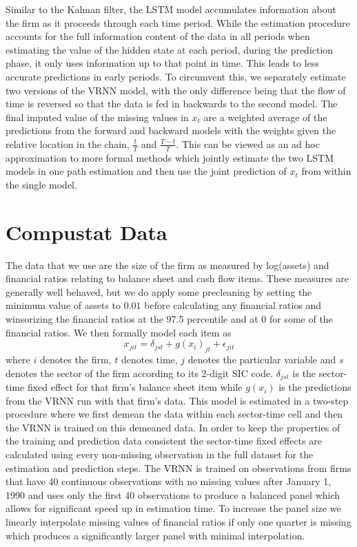 \documentclass[12pt]{article}
\begin{document}
Similar to the Kalman filter, the LSTM model accumulates information about the firm as it proceeds through each time period. 
While the estimation procedure accounts for the full information content of the data in all periods when estimating the 
value of the hidden state at each period, during the prediction phase, it only uses information up to that point in time. 
This leads to less accurate predictions in early periods. To circumvent this, we separately estimate two versions of the 
VRNN model, with the only difference being that the flow of time is reversed so that the data is fed in backwards 
to the second model. The final imputed value of the missing values in $x_t$ are a weighted average of the predictions from 
the forward and backward models with the weights given the relative location in the chain, $\frac{t}{T}$ and $\frac{T-t}{T}$. 
This can be viewed as an ad hoc approximation to more formal methods which jointly estimate the two LSTM models in one 
path estimation and then use the joint prediction of $x_t$ from within the single model.


\section{Compustat Data}

The data that we use are the size of the firm as measured by log(assets) and financial ratios relating to balance sheet and 
cash flow items. These measures are generally well behaved, but we do apply some precleaning by setting the minimum value of 
assets to $0.01$ before calculating any financial ratios and winsorizing the financial ratios at the 
97.5 percentile and at 0 for some of the financial ratios. We then formally model each item as 
\begin{equation}
   x_{jit} = \delta_{jst} + g(x_{i})_{jt} + \epsilon_{jit}
\end{equation}
where $i$ denotes the firm, $t$ denotes time, $j$ denotes the particular variable and $s$ denotes the sector of the firm according 
to its 2-digit SIC code. $\delta_{jst}$ is the sector-time fixed effect for that firm's balance sheet item while $g(x_{i})$ is 
the predictions from the VRNN run with that firm's data. This model is estimated in a two-step procedure where we first 
demean the data within each sector-time cell and then the VRNN is trained on this demeaned data. In order to keep the properties 
of the training and prediction data consistent the sector-time fixed effects are calculated using every non-missing observation in 
the full dataset for the estimation and prediction steps. The VRNN is trained on observations from firms that have 40 continuous 
observations with no missing values after January 1, 1990 and uses only the first 40 observations to produce a balanced panel which 
allows for significant speed up in estimation time. To increase the panel size we linearly interpolate missing values of financial ratios 
if only one quarter is missing which produces a significantly larger panel with minimal interpolation. 
\end{document}
